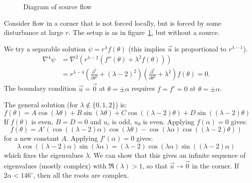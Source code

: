 \documentclass[../Main.tex]{subfiles}
\begin{document}
\begin{figure}
    \centering
    \caption{Diagram of source flow}
    \label{figSourceFlow}
\end{figure}
\begin{example}
    Consider flow in a corner that is not forced locally, but is forced by some disturbance at large $r$. The setup is as in figure~\ref{figSourceFlow}, but without a source.

    We try a separable solution $\psi = r^\lambda f(\theta)$ (this implies $\vec{u}$ is proportional to $r^{\lambda - 1}$).
    \begin{align*}
        \nabla^4\psi &= \nabla^2 \left(r^{\lambda - 2} \left(f''(\theta) + \lambda^2 f(\theta)\right)\right) \\
        &= r^{\lambda - 4} \left(\frac{\partial^{2}}{\partial \theta^{2}}+ (\lambda - 2)^2\right)\left(\frac{\partial^{2}}{\partial \theta^{2}} + \lambda^2\right) f(\theta) = 0.
    \end{align*}
    The boundary condition $\vec u = \vec0$ at $\theta = \pm \alpha$ requires $f = f' = 0$ at $\theta = \pm \alpha$.

    The general solution (for $\lambda \not\in \{0, 1, 2\}$) is:
    \begin{equation*}
        f(\theta) = A\cos(\lambda \theta) + B\sin(\lambda \theta) + C \cos((\lambda - 2)\theta) + D\sin((\lambda - 2)\theta)
    \end{equation*}
    If $f(\theta)$ is even, $B = D = 0$ and $u_r$ is odd, $u_\theta$ is even. Applying $f(\alpha) = 0$ gives:
    \begin{equation*}
        f(\theta) = A' \left(\cos((\lambda - 2)\alpha) \cos(\lambda \theta) - \cos(\lambda \alpha) \cos((\lambda - 2)\theta)\right)
    \end{equation*}
    for a new constant $A$. Applying $f'(\alpha) = 0$ gives:
    \begin{equation*}
        \lambda \cos((\lambda - 2)\alpha) \sin(\lambda \alpha) = (\lambda - 2) \cos(\lambda \alpha) \sin((\lambda - 2)\alpha)
    \end{equation*}
    which fixes the eigenvalues $\lambda$. We can show that this gives an infinite sequence of eigenvalues (mostly complex) with $\Re(\lambda) > 1$, so that $\vec u \to \vec 0$ in the corner. If $2\alpha < 146^\circ$, then all the roots are complex.


\end{example}
\end{document}
